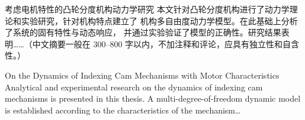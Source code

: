 
\begin{cnabstract}[实验研究与动力学模型]{考虑电机特性的凸轮分度机构动力学研究}
本文针对凸轮分度机构进行了动力学理论和实验研究，针对机构特点建立了
机构多自由度动力学模型。在此基础上分析了系统的固有特性与动态响应，
并通过实验验证了模型的正确性。研究结果表明……（中文摘要一般在
300--800 字以内，不加注释和评论，应具有独立性和自含性。）
\end{cnabstract}

\begin{enabstract}{On the Dynamics of Indexing Cam Mechanisms with Motor Characteristics}
Analytical and experimental research on the dynamics of indexing cam
mechanisms is presented in this thesis. A multi-degree-of-freedom dynamic
model is established according to the characteristics of the mechanism\ldots
\end{enabstract}
